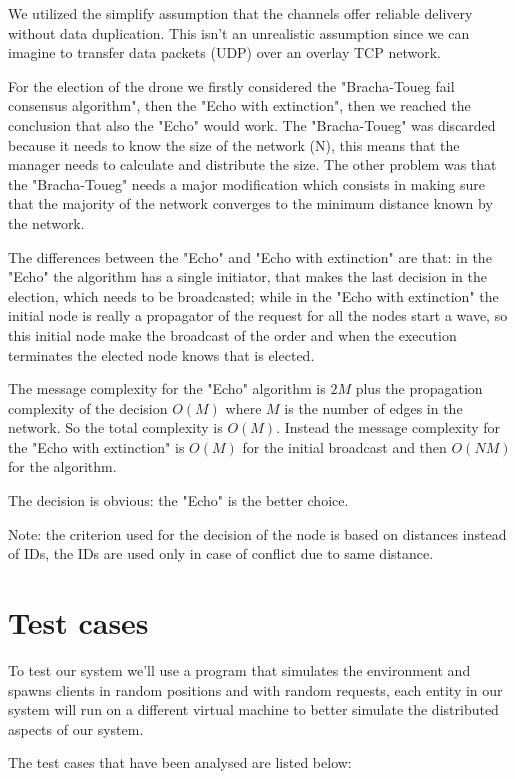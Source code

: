 \documentclass[a4paper, oneside]{memoir}
\begin{document}
We utilized the simplify assumption that the channels offer reliable delivery without data duplication. This isn't an unrealistic assumption since we can imagine to transfer data packets (UDP) over an overlay TCP network.

For the election of the drone we firstly considered the "Bracha-Toueg fail consensus algorithm", then the "Echo with extinction", then we reached the conclusion that also the "Echo" would work. The "Bracha-Toueg" was discarded because it needs to know the size of the network (N), this means that the manager needs to calculate and distribute the size. The other problem was that the "Bracha-Toueg" needs a major modification which consists in making sure that the majority of the network converges to the minimum distance known by the network.

The differences between the "Echo" and "Echo with extinction" are that: in the "Echo" the algorithm has a single initiator, that makes the last decision in the election, which needs to be broadcasted; while in the "Echo with extinction" the initial node is really a propagator of the request for all the nodes start a wave, so this initial node make the broadcast of the order and when the execution terminates the elected node knows that is elected.

The message complexity for the "Echo" algorithm is $2M$ plus the propagation complexity of the decision $O(M)$ where $M$ is the number of edges in the network. So the total complexity is $ O(M) $.
Instead the message complexity for the "Echo with extinction" is $O(M)$ for the initial broadcast and then $O(N M)$ for the algorithm.

The decision is obvious: the "Echo" is the better choice.

Note: the criterion used for the decision of the node is based on distances instead of IDs, the IDs are used only in case of conflict due to same distance.


\section{Test cases}

To test our system we'll use a program that simulates the environment and spawns clients in random positions and with random requests, each entity in our system will run on a different virtual machine to better simulate the distributed aspects of our system.

The test cases that have been analysed are listed below:\\
\end{document}

